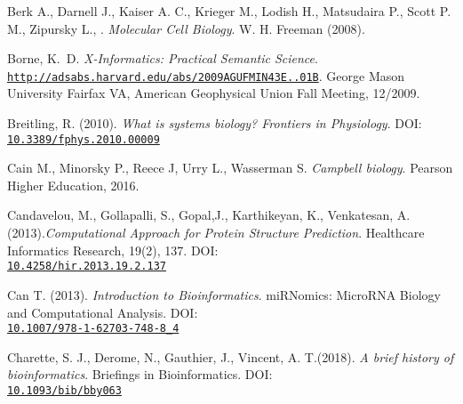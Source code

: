 \documentclass[twoside,openright,titlepage,fleqn,
,	headinclude,12pt,a4paper,BCOR5mm,footinclude,table]{scrbook}
\newcommand{\?}{'\-\nobreak\hspace{0pt}}
\begin{document}
\begin{thebibliography}{50}
Berk A., Darnell J., Kaiser A. C., Krieger M., Lodish H., Matsudaira P., Scott P. M., Zipursky L., . \newline
\textit{Molecular Cell Biology}.\newline
W. H. Freeman (2008).

Borne, K.~D.\newline
\textit{X-Informatics: Practical Semantic Science}.
\\\texttt{\url{http://adsabs.harvard.edu/abs/2009AGUFMIN43E..01B}}. \newline
George Mason University Fairfax VA, American Geophysical Union Fall Meeting, 12/2009.

Breitling, R. (2010). \newline
\textit{What is systems biology? Frontiers in Physiology}.\newline
DOI: \\\texttt{\url{10.3389/fphys.2010.00009}}

Cain M., Minorsky P., Reece J, Urry L., Wasserman S. \newline
\textit{Campbell biology}. \newline
Pearson Higher Education, 2016.


Candavelou, M., Gollapalli, S., Gopal,J., Karthikeyan, K., Venkatesan, A.(2013).\newline \textit{Computational Approach for Protein Structure Prediction}.\newline
Healthcare Informatics Research, 19(2), 137. \newline
DOI: \\\texttt{\url{10.4258/hir.2013.19.2.137}}

Can T. (2013).\newline
\textit{Introduction to Bioinformatics}.\newline
miRNomics: MicroRNA Biology and Computational Analysis.\newline
DOI: \\\texttt{\url{10.1007/978-1-62703-748-8_4}}

Charette, S. J., Derome, N., Gauthier, J., Vincent, A. T.(2018). \newline
\textit{A brief history of bioinformatics}. \newline
Briefings in Bioinformatics.\newline
DOI: \\\texttt{\url{10.1093/bib/bby063}}


\end{thebibliography}
\end{document}
